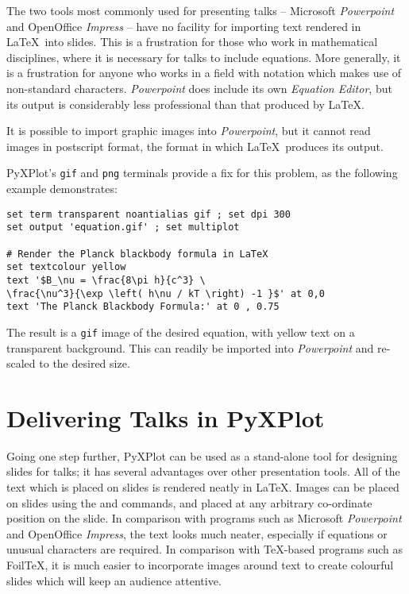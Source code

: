The two tools most commonly used for presenting talks --
Microsoft {\it Powerpoint} and
OpenOffice {\it Impress} -- have no facility for importing
text rendered in \LaTeX\ into slides. This is a frustration for those who work
in mathematical disciplines, where it is necessary for talks to include
equations. More generally, it is a frustration for anyone who works in a field
with notation which makes use of non-standard characters. {\it Powerpoint} does
include its own {\it Equation Editor}, but its output is considerably less
professional than that produced by \LaTeX.

It is possible to import graphic images into {\it Powerpoint}, but it cannot
read images in postscript format, the format in which \LaTeX\ produces its
output.

PyXPlot's {\tt gif} and {\tt png} terminals provide a fix for this problem, as
the following example demonstrates:

\begin{verbatim}
set term transparent noantialias gif ; set dpi 300
set output 'equation.gif' ; set multiplot

# Render the Planck blackbody formula in LaTeX
set textcolour yellow
text '$B_\nu = \frac{8\pi h}{c^3} \
\frac{\nu^3}{\exp \left( h\nu / kT \right) -1 }$' at 0,0
text 'The Planck Blackbody Formula:' at 0 , 0.75
\end{verbatim}

The result is a {\tt gif} image of the desired equation, with yellow text on a
transparent background. This can readily be imported into {\it Powerpoint} and
re-scaled to the desired size.

\section{Delivering Talks in PyXPlot}

Going one step further, PyXPlot can be used as a stand-alone tool for designing
slides for talks; it has several advantages over other presentation tools.  All
of the text which is placed on slides is rendered neatly in \LaTeX.  Images can
be placed on slides using the \indcmdts{jpeg} and \indcmdts{eps} commands, and
placed at any arbitrary co-ordinate position on the slide.  In comparison with
programs such as Microsoft {\it Powerpoint}\index{Microsoft Powerpoint} and
OpenOffice\index{OpenOffice} {\it Impress}, the text looks much neater,
especially if equations or unusual characters are required. In comparison with
\TeX-based programs such as Foil\TeX, it is much easier to incorporate images
around text to create colourful slides which will keep an audience attentive.


